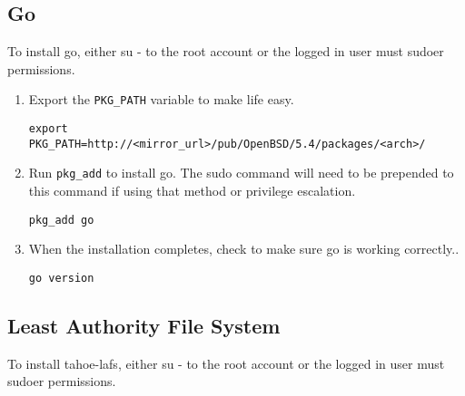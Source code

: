 \documentclass[letterpaper]{article}
\begin{document}
\subsection{Go}

To install go, either su - to the root account or the logged in user must
sudoer permissions.

\begin{enumerate}

\item
Export the \verb=PKG_PATH= variable to make life easy.
\begin{verbatim}
export PKG_PATH=http://<mirror_url>/pub/OpenBSD/5.4/packages/<arch>/
\end{verbatim}

\item
Run \verb=pkg_add= to install go.  The sudo command will need to be prepended
to this command if using that method or privilege escalation.
\begin{verbatim}
pkg_add go
\end{verbatim}

\item
When the installation completes, check to make sure go is working correctly..
\begin{verbatim}
go version
\end{verbatim}

\end{enumerate}

\subsection{Least Authority File System}

To install tahoe-lafs, either su - to the root account or the logged in user must
sudoer permissions.
\end{document}
